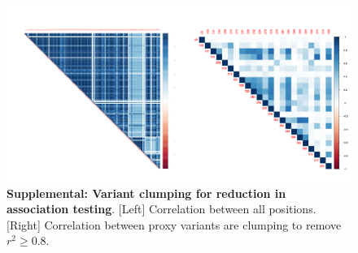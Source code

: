 \documentclass{article} %
\begin{document}
\begin{figure}[ht] \hspace{-0.5cm} 
    \includegraphics[scale=0.85]{S1}
	\caption{\textbf{Supplemental: Variant clumping for reduction in association testing}. [Left] Correlation between all positions. [Right] Correlation between proxy variants are clumping to remove $r^2 \ge 0.8$.}
	\label{fig:S1}
\end{figure}
\end{document}
